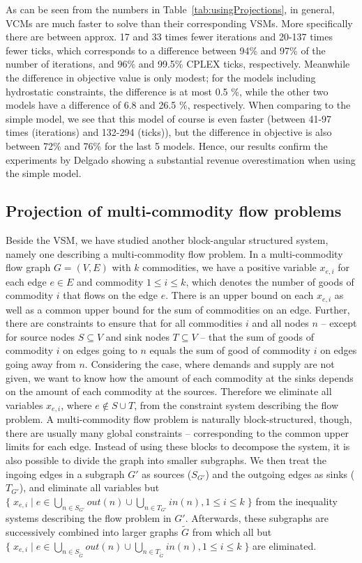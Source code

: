 As can be seen from the numbers in Table~\ref{tab:usingProjections}, in general, VCMs are much faster to solve than their corresponding VSMs. More specifically there are between approx. 17 and 33 times fewer iterations and 20-137 times fewer ticks, which corresponds to a difference between 94\% and 97\% of the number of iterations, and 96\% and 99.5\% CPLEX ticks, respectively. Meanwhile the difference in objective value is only modest; for the models including hydrostatic constraints, the difference is at most 0.5 \%, while the other two models have a difference of 6.8 and 26.5 \%, respectively. 
When comparing to the simple model, we see that this model of course is even faster (between 41-97 times (iterations) and 132-294 (ticks)), but the difference in objective is also between 72\% and 76\% for the last 5 models. Hence, our results confirm the experiments by Delgado \cite{AlbertosThesis} showing a substantial revenue overestimation when using the simple model. 

\subsection{Projection of multi-commodity flow problems}
Beside the VSM, we have studied another block-angular structured system, namely one describing a multi-commodity flow problem. In a multi-commodity flow graph $G=(V,E)$ with $k$ commodities, we have a positive variable $x_{e,i}$ for each edge $e\in E$ and commodity $1\leq i\leq k$, which denotes the number of goods of commodity $i$ that flows on the edge $e$. There is an upper bound on each $x_{e,i}$ as well as a common upper bound for the sum of commodities on an edge. Further, there are constraints to ensure that for all commodities $i$ and all nodes $n$ -- except for source nodes $S\subseteq V$ and sink nodes $T\subseteq V$ -- that the sum of goods of commodity $i$ on edges going to $n$ equals the sum of good of commodity $i$ on edges going away from $n$. Considering the case, where demands and supply are not given, we want to know how the amount of each commodity at the sinks depends on the amount of each commodity at the sources. Therefore we eliminate all variables $x_{e,i}$, where $e\notin S\cup T$, from the constraint system describing the flow problem. A multi-commodity flow problem is naturally block-structured, though, there are usually many global constraints -- corresponding to the common upper limits for each edge. Instead of using these blocks to decompose the system, it is also possible to divide the graph into smaller subgraphs. We then treat the ingoing edges in a subgraph $G'$ as sources ($S_{G'}$) and the outgoing edges as sinks ($T_{G'}$), and eliminate all variables but $\{\;x_{e,i}\;|\; e\in \bigcup_{n\in S_{G'}}out(n)\cup \bigcup_{n\in T_{G'}}in(n), 1\leq i\leq k\;\}$ from the inequality systems describing the flow problem in $G'$. Afterwards, these subgraphs are successively combined into larger graphs $\tilde{G}$ from which all but $\{\;x_{e,i}\;|\; e\in \bigcup_{n\in S_{\tilde G}}out(n)\cup \bigcup_{n\in T_{\tilde G}}in(n), 1\leq i\leq k\;\}$ are eliminated. 

